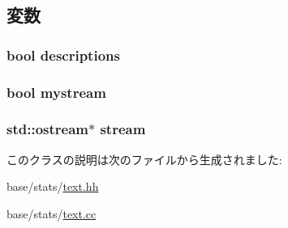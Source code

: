 \subsection{変数}
\hypertarget{classStats_1_1Text_ada0eec8923acca0939a06f40c6a88af8}{
\subsubsection[{descriptions}]{\setlength{\rightskip}{0pt plus 5cm}bool {\bf descriptions}}}
\label{classStats_1_1Text_ada0eec8923acca0939a06f40c6a88af8}
\hypertarget{classStats_1_1Text_aa65f5a10ec2c985671c2f8696c43a3b4}{
\subsubsection[{mystream}]{\setlength{\rightskip}{0pt plus 5cm}bool {\bf mystream}}}
\label{classStats_1_1Text_aa65f5a10ec2c985671c2f8696c43a3b4}
\hypertarget{classStats_1_1Text_adc3bdd1632f41d809c78a20c0733715c}{
\subsubsection[{stream}]{\setlength{\rightskip}{0pt plus 5cm}std::ostream$\ast$ {\bf stream}}}
\label{classStats_1_1Text_adc3bdd1632f41d809c78a20c0733715c}


このクラスの説明は次のファイルから生成されました:\begin{DoxyCompactItemize}
\item 
base/stats/\hyperlink{text_8hh}{text.hh}\item 
base/stats/\hyperlink{text_8cc}{text.cc}\end{DoxyCompactItemize}

